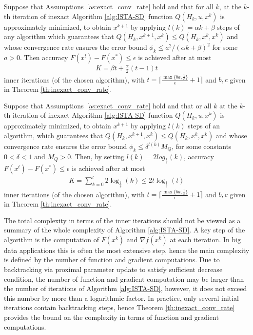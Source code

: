 \documentclass[11pt]{article}
\numberwithin{equation}{section}
\begin{document}
\begin{theorem}\label{th:inexact_total_conv_rate_k2}
Suppose that Assumptions~\ref{as:exact_conv_rate} hold and that for all $k$, at the $k$-th iteration of inexact Algorithm \ref{alg:ISTA-SD} 
function $Q(H_k, u, x^k)$ is approximately minimized, to obtain $x^{k+1}$ by applying $l(k)=\alpha k+\beta$ steps of any algorithm which guarantees that
 $Q(H_k, x^{k+1}, x^k)\leq Q(H_k, x^k, x^k)$ and whose convergence 
rate ensures  the error bound $\phi_k\leq a^2/(\alpha k+\beta)^2$ for some $a>0$.  Then accuracy $F(x^t) - F(x^*)\leq \epsilon$ is achieved after at most 
\begin{align}
    \label{eq:total_bound_F_F*}
	K=\beta t+ \frac{\alpha}{2}(t-1)t
\end{align}
inner iterations (of the chosen algorithm), 
with $t=\lceil \frac{\max\{b a, \frac{1}{c}\}}{\epsilon} +1\rceil$
 and $b, c$  given in Theorem \ref{th:inexact_conv_rate}. 
\end{theorem}
\begin{theorem}\label{th:inexact_total_conv_rate_klogk}
Suppose that Assumptions~\ref{as:exact_conv_rate} hold and that or all $k$ at the $k$-th iteration of inexact Algorithm \ref{alg:ISTA-SD} 
function $Q(H_k, u, x^k)$ is approximately minimized, to obtain $x^{k+1}$ by applying  $l(k)$ steps of an algorithm, which guarantees that
 $Q(H_k, x^{k+1}, x^k)\leq Q(H_k, x^k, x^k)$ and whose convergence 
rate ensures  the error bound $\phi_k\leq \delta^{l(k)}M_Q$, for some constants $0<\delta<1$ and $M_Q>0$. 
 Then, by setting $l(k)= 2 log_{\frac{1}{\delta}}(k)$, accuracy $F(x^t) - F(x^*)\leq \epsilon$ is achieved after at most 
\begin{align}
    \label{eq:total_bound_F_F*}
	K=\sum_{k=0}^t 2 \log_{\frac{1}{\delta}}(k)\leq 2t \log_{\frac{1}{\delta}}(t)
	\end{align}
	inner iterations (of the chosen algorithm), with $t=\lceil \frac{\max\{b a, \frac{1}{c}\}}{\epsilon} +1\rceil$
and  $b, c$  given in Theorem \ref{th:inexact_conv_rate}. 
\end{theorem}

\begin{remark} The total complexity in terms of the inner iterations should not be viewed as  a summary of the whole complexity of Algorithm \ref{alg:ISTA-SD}.
A key step of the algorithm is the computation of $F(x^{k})$ and $\nabla f(x^k)$ at each iteration. In  big data applications this is often the 
most extensive step, hence the main complexity is defined by the number of function and gradient computations. 
Due to backtracking via proximal parameter update to satisfy sufficient decrease condition, 
the number of function and gradient  computation may be larger than the number of iterations of 
Algorithm \ref{alg:ISTA-SD}, however,
 it does not exceed this number  by more than a logarithmic factor. In practice, only several initial iterations contain backtracking steps, hence 
 Theorem  \ref{th:inexact_conv_rate} provides the bound  on the complexity in terms of function and gradient computations. 
\end{remark}
\end{document}

